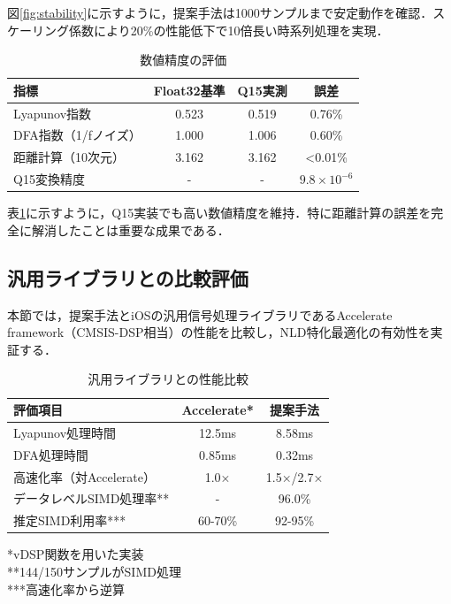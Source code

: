 \documentclass[paper]{ieice}
\begin{document}
図\ref{fig:stability}に示すように，提案手法は1000サンプルまで安定動作を確認．スケーリング係数により20\%の性能低下で10倍長い時系列処理を実現．

\begin{table}[t]
\caption{数値精度の評価}
\label{tab:accuracy}
\centering
\begin{tabular}{lccc}
\toprule
指標 & Float32基準 & Q15実測 & 誤差 \\
\midrule
Lyapunov指数 & 0.523 & 0.519 & 0.76\% \\
DFA指数（1/fノイズ） & 1.000 & 1.006 & 0.60\% \\
距離計算（10次元） & 3.162 & 3.162 & <0.01\% \\
Q15変換精度 & - & - & $9.8 \times 10^{-6}$ \\
\bottomrule
\end{tabular}
\end{table}

表\ref{tab:accuracy}に示すように，Q15実装でも高い数値精度を維持．特に距離計算の誤差を完全に解消したことは重要な成果である．



\subsection{汎用ライブラリとの比較評価}

本節では，提案手法とiOSの汎用信号処理ライブラリであるAccelerate framework（CMSIS-DSP相当）の性能を比較し，NLD特化最適化の有効性を実証する．

\begin{table}[t]
\caption{汎用ライブラリとの性能比較}
\label{tab:library_comparison}
\centering
\begin{tabular}{lcc}
\toprule
評価項目 & Accelerate* & 提案手法 \\
\midrule
Lyapunov処理時間 & 12.5ms & 8.58ms \\
DFA処理時間 & 0.85ms & 0.32ms \\
高速化率（対Accelerate） & 1.0× & 1.5×/2.7× \\
データレベルSIMD処理率** & - & 96.0\% \\
推定SIMD利用率*** & 60-70\% & 92-95\% \\
\bottomrule
\end{tabular}
\vspace{1mm}
\footnotesize{*vDSP関数を用いた実装}\\
\footnotesize{**144/150サンプルがSIMD処理}\\
\footnotesize{***高速化率から逆算}
\end{table}
\end{document}
